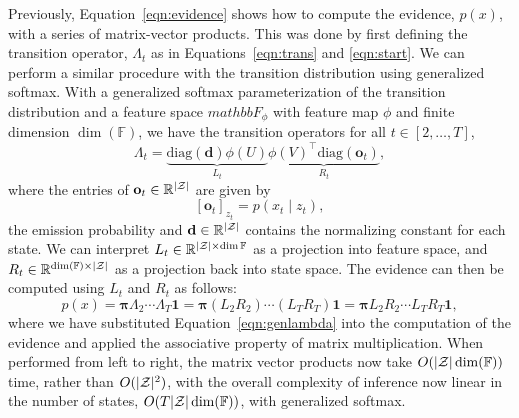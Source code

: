 \documentclass{article}
\begin{document}
Previously, Equation~\ref{eqn:evidence} shows how to compute the evidence,
$p(x)$, with a series of matrix-vector products.
This was done by first defining the transition operator,
$\Lambda_t$ as in Equations~\ref{eqn:trans} and \ref{eqn:start}.
We can perform a similar procedure with the transition distribution using generalized softmax.
With a generalized softmax parameterization of the transition distribution
and a feature space $mathbb{F}_\phi$ with feature map $\phi$ and finite dimension $\dim(\mathbb{F})$,
we have the transition operators for all $t \in [2, \ldots, T]$,
\begin{equation}
\label{eqn:genlambda}
\Lambda_t =
\underbrace{\textrm{diag}(\mathbf{d})\phi(U)}_{L_t}\underbrace{{\phi(V)}^\top\textrm{diag}(\mathbf{o}_t)}_{R_t},
\end{equation}
where the entries of $\mathbf{o}_t\in\mathbb{R}^{|\mathcal{Z}|}$
are given by
$$
[\mathbf{o}_t]_{z_t} = p(x_t \mid z_t),
$$
the emission probability and $\mathbf{d}\in\mathbb{R}^{|\mathcal{Z}|}$ contains the normalizing constant
for each state.
We can interpret $L_t\in\mathbb{R}^{|\mathcal{Z}|\times\dim{\mathbb{F}}}$ as a 
projection into feature space, and $R_t\in\mathbb{R}^{\dim(\mathbb{F})\times|\mathcal{Z}|}$
as a projection back into state space.
The evidence can then be computed using $L_t$ and $R_t$ as follows:
\begin{equation}
\label{eqn:genevidence}
p(x)
= \bm\pi\Lambda_2\cdots\Lambda_T\mathbf{1}
= \bm\pi(L_2R_2)\cdots (L_TR_T)\mathbf{1}
= \bm\pi L_2R_2\cdots L_TR_T\mathbf{1},
\end{equation}
where we have substituted Equation~\ref{eqn:genlambda} into the computation of the evidence
and applied the associative property of matrix multiplication.
When performed from left to right, the matrix vector products now take $O(|\mathcal{Z}|\dim(\mathbb{F}))$
time, rather than $O(|\mathcal{Z}|^2)$,
with the overall complexity of inference now linear in the number of states,
$O(T|\mathcal{Z}|\dim(\mathbb{F}))$,
with generalized softmax.
\end{document}
